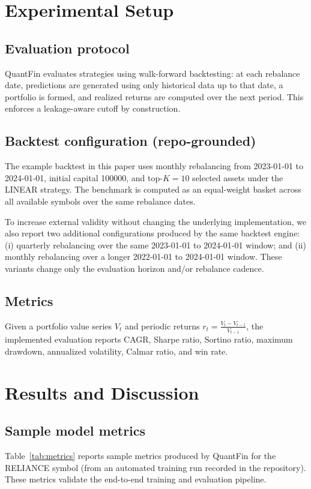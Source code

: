 \documentclass[conference]{IEEEtran}
\begin{document}
\section{Experimental Setup}\label{sec:setup}
\subsection{Evaluation protocol}
QuantFin evaluates strategies using walk-forward backtesting: at each rebalance date, predictions are generated using only historical data up to that date, a portfolio is formed, and realized returns are computed over the next period. This enforces a leakage-aware cutoff by construction.

\subsection{Backtest configuration (repo-grounded)}
The example backtest in this paper uses monthly rebalancing from 2023-01-01 to 2024-01-01, initial capital 100000, and top-$K=10$ selected assets under the LINEAR strategy. The benchmark is computed as an equal-weight basket across all available symbols over the same rebalance dates.

To increase external validity without changing the underlying implementation, we also report two additional configurations produced by the same backtest engine: (i) quarterly rebalancing over the same 2023-01-01 to 2024-01-01 window; and (ii) monthly rebalancing over a longer 2022-01-01 to 2024-01-01 window. These variants change only the evaluation horizon and/or rebalance cadence.

\subsection{Metrics}
Given a portfolio value series $V_t$ and periodic returns $r_t=\frac{V_t-V_{t-1}}{V_{t-1}}$, the implemented evaluation reports CAGR, Sharpe ratio, Sortino ratio, maximum drawdown, annualized volatility, Calmar ratio, and win rate.

\section{Results and Discussion}\label{sec:results}
\subsection{Sample model metrics}
Table~\ref{tab:metrics} reports sample metrics produced by QuantFin for the RELIANCE symbol (from an automated training run recorded in the repository). These metrics validate the end-to-end training and evaluation pipeline.
\end{document}
